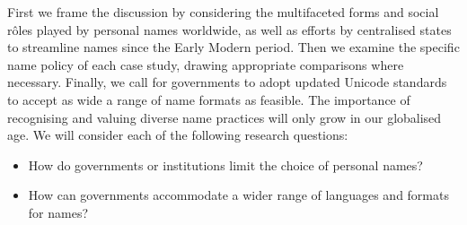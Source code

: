 First we frame the discussion by considering the multifaceted forms and social
rôles played by personal names worldwide, as well as efforts by centralised
states to streamline names since the Early Modern period. Then we examine the
specific name policy of each case study, drawing appropriate comparisons where
necessary. Finally, we call for governments to adopt updated Unicode standards
to accept as wide a range of name formats as feasible. The importance of
recognising and valuing diverse name practices will only grow in our globalised
age. We will consider each of the following research questions:

\begin{itemize}
\item How do governments or institutions limit the choice of personal names?
\item How can governments accommodate a wider range of languages and formats for
	names?
\end{itemize}
